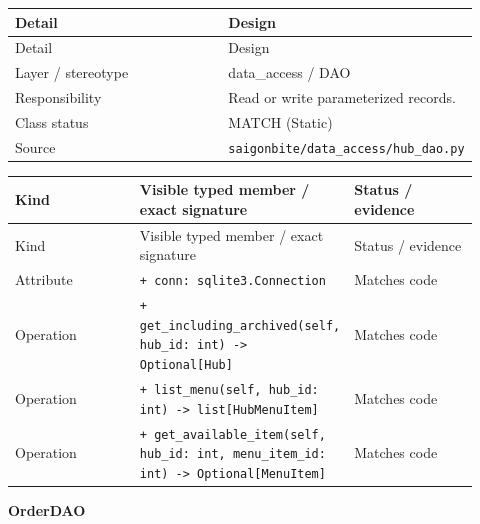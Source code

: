\begin{longtable}{>{\raggedright\arraybackslash}p{0.4600\linewidth}>{\raggedright\arraybackslash}p{0.4600\linewidth}}
Detail & Design \\
\hline\endfirsthead
Detail & Design \\
\hline\endhead
Layer / stereotype & data\_access / \guillemotleft{}DAO\guillemotright{} \\
Responsibility & Read or write parameterized records. \\
Class status & MATCH (Static) \\
Source & \texttt{saigonbite/\allowbreak{}data\_\allowbreak{}access/\allowbreak{}hub\_\allowbreak{}dao.\allowbreak{}py} \\
\end{longtable}
\begin{longtable}{>{\raggedright\arraybackslash}p{0.3067\linewidth}>{\raggedright\arraybackslash}p{0.3067\linewidth}>{\raggedright\arraybackslash}p{0.3067\linewidth}}
Kind & Visible typed member / exact signature & Status / evidence \\
\hline\endfirsthead
Kind & Visible typed member / exact signature & Status / evidence \\
\hline\endhead
Attribute & \texttt{+ conn: sqlite3.\allowbreak{}Connection} & Matches code \\
Operation & \texttt{+ get\_\allowbreak{}including\_\allowbreak{}archived(self, hub\_\allowbreak{}id: int) -\textgreater{} Optional[Hub]} & Matches code \\
Operation & \texttt{+ list\_\allowbreak{}menu(self, hub\_\allowbreak{}id: int) -\textgreater{} list[HubMenuItem]} & Matches code \\
Operation & \texttt{+ get\_\allowbreak{}available\_\allowbreak{}item(self, hub\_\allowbreak{}id: int, menu\_\allowbreak{}item\_\allowbreak{}id: int) -\textgreater{} Optional[MenuItem]} & Matches code \\
\end{longtable}
\textbf{OrderDAO}

